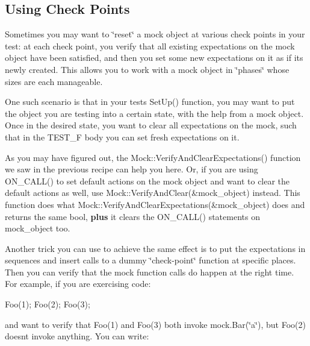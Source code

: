 \subsection*{Using Check Points}

Sometimes you may want to \char`\"{}reset\char`\"{} a mock object at various check points in your test\+: at each check point, you verify that all existing expectations on the mock object have been satisfied, and then you set some new expectations on it as if it\textquotesingle{}s newly created. This allows you to work with a mock object in \char`\"{}phases\char`\"{} whose sizes are each manageable.

One such scenario is that in your test\textquotesingle{}s {\ttfamily Set\+Up()} function, you may want to put the object you are testing into a certain state, with the help from a mock object. Once in the desired state, you want to clear all expectations on the mock, such that in the {\ttfamily T\+E\+S\+T\+\_\+F} body you can set fresh expectations on it.

As you may have figured out, the {\ttfamily Mock\+::\+Verify\+And\+Clear\+Expectations()} function we saw in the previous recipe can help you here. Or, if you are using {\ttfamily O\+N\+\_\+\+C\+A\+L\+L()} to set default actions on the mock object and want to clear the default actions as well, use {\ttfamily Mock\+::\+Verify\+And\+Clear(\&mock\+\_\+object)} instead. This function does what {\ttfamily Mock\+::\+Verify\+And\+Clear\+Expectations(\&mock\+\_\+object)} does and returns the same {\ttfamily bool}, {\bfseries plus} it clears the {\ttfamily O\+N\+\_\+\+C\+A\+L\+L()} statements on {\ttfamily mock\+\_\+object} too.

Another trick you can use to achieve the same effect is to put the expectations in sequences and insert calls to a dummy \char`\"{}check-\/point\char`\"{} function at specific places. Then you can verify that the mock function calls do happen at the right time. For example, if you are exercising code\+:


\begin{DoxyCode}
Foo(1);
Foo(2);
Foo(3);
\end{DoxyCode}


and want to verify that {\ttfamily Foo(1)} and {\ttfamily Foo(3)} both invoke {\ttfamily mock.\+Bar(\char`\"{}a\char`\"{})}, but {\ttfamily Foo(2)} doesn\textquotesingle{}t invoke anything. You can write\+:


